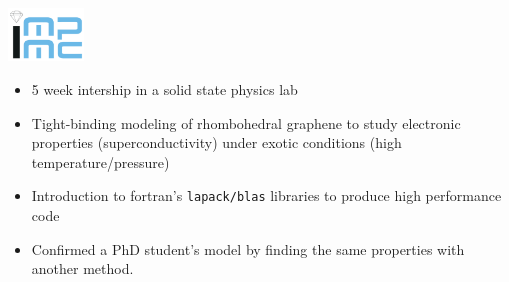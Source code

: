 \noindent
\begin{minipage}{.15\textwidth}
    \centerline{\includegraphics[width=20mm]{img/impmc}}
\end{minipage}%
\hspace{5mm}
\begin{minipage}{.8\textwidth}
    \raggedright
    \begin{itemize}
	\item 5 week intership in a solid state physics lab
	\item Tight-binding modeling of rhombohedral graphene to study electronic properties (superconductivity) under exotic conditions (high temperature/pressure)
	\item Introduction to fortran's \texttt{lapack/blas} libraries to produce high performance code
	\item Confirmed a PhD student's model by finding the same properties with another method.
    \end{itemize}
\end{minipage}
